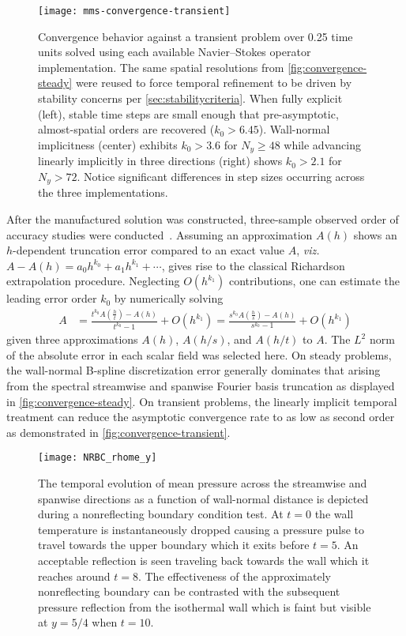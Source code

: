 \begin{figure}[t]
\centering
\texttt{[image: mms-convergence-transient]}
\caption[Verification of Suzerain against a transient manufactured solution]{%
  Convergence behavior against a transient problem over 0.25 time units solved
  using each available Navier--Stokes operator implementation.  The same
  spatial resolutions from \autoref{fig:convergence-steady} were reused to
  force temporal refinement to be driven by stability concerns per
  \autoref{sec:stabilitycriteria}.  When fully explicit (left), stable time
  steps are small enough that pre-asymptotic, almost-spatial orders are
  recovered ($k_0>6.45$).  Wall-normal implicitness (center) exhibits $k_0>3.6$
  for $N_y\geq{}48$ while advancing linearly implicitly in three directions
  (right) shows $k_0>2.1$ for $N_y>72$.  Notice significant differences in
  step sizes occurring across the three
  implementations.\label{fig:convergence-transient}
}
\end{figure}

After the manufactured solution was constructed, three-sample observed order of
accuracy studies were conducted~\citep{Roy2005, Roache1998Verification}.
Assuming an approximation $A(h)$ shows an $h$-dependent truncation
error compared to an exact value $A$, \textit{viz.} $A - A(h) = a_0h^{k_0} +
a_1h^{k_1} + \cdots$, gives rise to the classical Richardson extrapolation
procedure.  Neglecting $O(h^{k_1})$ contributions, one can estimate the leading
error order $k_0$ by numerically solving
\begin{align}
  A &=
  \frac{t^{k_0}A\!\left(\frac{h}{t}\right) - A(h)}{t^{k_0}-1} + O(h^{k_1})
  = \frac{s^{k_0}A\!\left(\frac{h}{s}\right) - A(h)}{s^{k_0}-1} + O(h^{k_1})
  \label{eq:orderest}
\end{align}
given three approximations $A(h)$, $A(h/s)$, and $A(h/t)$ to $A$.  The $L^2$
norm of the absolute error in each scalar field was selected here.  On steady
problems, the wall-normal B-spline discretization error generally dominates that
arising from the spectral streamwise and spanwise Fourier basis truncation as
displayed in \autoref{fig:convergence-steady}.  On transient problems, the
linearly implicit temporal treatment can reduce the asymptotic convergence rate
to as low as second order as demonstrated in
\autoref{fig:convergence-transient}.

\begin{figure}
\centering
\texttt{[image: NRBC\_rhome\_y]}
\caption[Verification of nonreflecting boundary conditions]{%
  The temporal evolution of mean pressure across the streamwise and spanwise
  directions as a function of wall-normal distance is depicted during a
  nonreflecting boundary condition test.  At $t=0$ the wall temperature is
  instantaneously dropped causing a pressure pulse to travel towards the upper
  boundary which it exits before $t=5$.  An acceptable reflection is seen
  traveling back towards the wall which it reaches around $t=8$.  The
  effectiveness of the approximately nonreflecting boundary can be contrasted
  with the subsequent pressure reflection from the isothermal wall which is
  faint but visible at $y=5/4$ when $t=10$. \label{fig:nrbc-verify}
}
\end{figure}

